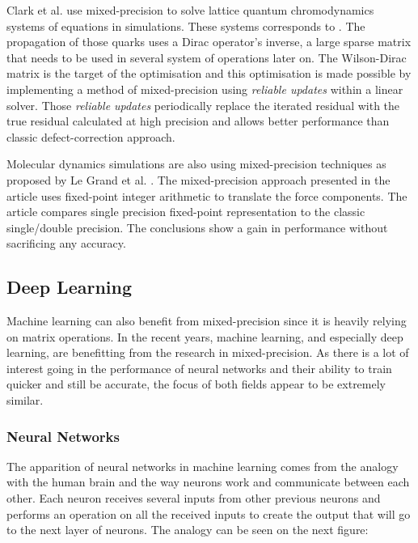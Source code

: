 Clark et al. \cite{Clark2010} use mixed-precision to solve lattice quantum chromodynamics systems of equations in simulations. These systems corresponds to . The propagation of those quarks uses a Dirac operator's inverse, a large sparse matrix that needs to be used in several system of operations later on. The Wilson-Dirac matrix is the target of the optimisation and this optimisation is made possible by implementing a method of mixed-precision using \emph{reliable updates} within a linear solver. Those \emph{reliable updates} periodically replace the iterated residual with the true residual calculated at high precision and allows better performance than classic defect-correction approach.

Molecular dynamics simulations are also using mixed-precision techniques as proposed by Le Grand et al. \cite{LeGrand2012}. The mixed-precision approach presented in the article uses fixed-point integer arithmetic to translate the force components. The article compares single precision fixed-point representation to the classic single/double precision. The conclusions show a gain in performance without sacrificing any accuracy.


\subsection{Deep Learning}

Machine learning can also benefit from mixed-precision since it is heavily relying on matrix operations. In the recent years, machine learning, and especially deep learning, are benefitting from the research in mixed-precision. As there is a lot of interest going in the performance of neural networks and their ability to train quicker and still be accurate, the focus of both fields appear to be extremely similar.


\subsubsection{Neural Networks}

The apparition of neural networks in machine learning comes from the analogy with the human brain and the way neurons work and communicate between each other. Each neuron receives several inputs from other previous neurons and performs an operation on all the received inputs to create the output that will go to the next layer of neurons. The analogy can be seen on the next figure:

